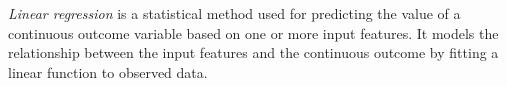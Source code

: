 









\emph{Linear regression} \cite{linear_regression} is a statistical method used for predicting the value of a continuous outcome variable based on one or more input features. It models the relationship between the input features and the continuous outcome by fitting a linear function to observed data.

